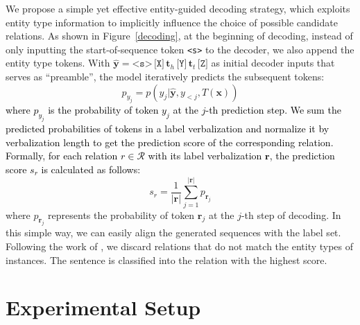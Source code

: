 \documentclass[11pt]{article}
\begin{document}
We propose a simple yet effective entity-guided decoding strategy, which exploits entity type information to implicitly influence the choice of possible candidate relations. As shown in Figure~\ref{decoding}, at the beginning of decoding, instead of only inputting the start-of-sequence token \texttt{<s>} to the decoder, we also append the entity type tokens. 
With $\hat{\boldsymbol{y}}=\texttt{<s>}\,\texttt{[X]}\, \boldsymbol{t}_h \, \texttt{[Y]} \,\boldsymbol{t}_t \,\texttt{[Z]}$ as initial decoder inputs that serves as ``preamble'', the model iteratively predicts the subsequent tokens:
\begin{equation*}
p_{y_j} = p(y_j|\hat{\boldsymbol{y}}, y_{<j}, T(\boldsymbol{x}))\end{equation*}
{\textcolor{black}{where $p_{y_j}$ is the probability of token $y_j$ at the $j$-th prediction step.
We sum the predicted probabilities of tokens in a label verbalization and normalize it by verbalization length to get the prediction score of the corresponding relation.
Formally, for each relation $r\in \mathcal{R}$ with its label verbalization $\boldsymbol{r}$, the prediction score $s_r$ is calculated as follows:}}
\begin{equation*}
s_r=\frac{1}{|\boldsymbol{r}|}\sum_{j=1}^{\boldsymbol{|r}|}p_{\boldsymbol{r}_j}
\end{equation*}
where $p_{\boldsymbol{r}_j}$ represents the probability of token $\boldsymbol{r}_j$ at the $j$-th step of decoding. In this simple way, we can easily align the generated sequences with the label set.
Following the work of \citet{DBLP:conf/emnlp/SainzLLBA21}, we discard relations that do not match the entity types of instances. The sentence is classified into the relation with the highest score.  

\section{Experimental Setup}
\end{document}
